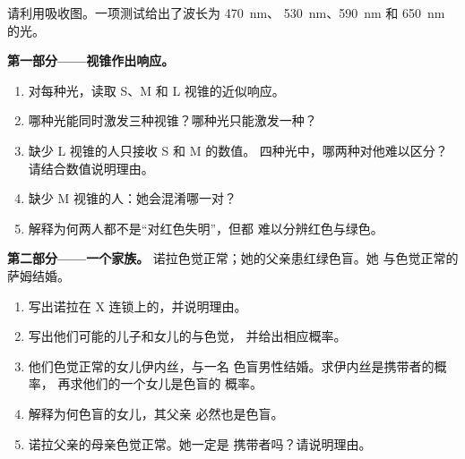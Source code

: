 \begin{problem}
\label{pb:g11:the-eye:1}
请利用吸收图。一项测试给出了波长为 \qty{470}{nm}、
\qty{530}{nm}、\qty{590}{nm} 和 \qty{650}{nm} 的光。

\medskip
\noindent\textbf{第一部分——视锥作出响应。}
\begin{enumerate}
  \item 对每种光，读取 S、M 和
        L 视锥的近似响应。
  \item 哪种光能同时激发三种视锥？哪种光只能激发一种？
  \item 缺少 L 视锥的人只接收 S 和 M 的数值。
        四种光中，哪两种对他难以区分？
        请结合数值说明理由。
  \item 缺少 M 视锥的人：她会混淆哪一对？
  \item 解释为何两人都不是“对红色失明”，但都
        难以分辨红色与绿色。
\end{enumerate}

\medskip
\noindent\textbf{第二部分——一个家族。}
诺拉色觉正常；她的父亲患红绿色盲。她
与色觉正常的萨姆结婚。
\begin{enumerate}[resume]
  \item 写出诺拉在 X 连锁上的，并说明理由。
  \item 写出他们可能的儿子和女儿的与色觉，
        并给出相应概率。
  \item 他们色觉正常的女儿伊内丝，与一名
        色盲男性结婚。求伊内丝是携带者的概率，
        再求他们的一个女儿是色盲的
        概率。
  \item 解释为何色盲的女儿，其父亲
        必然也是色盲。
  \item 诺拉父亲的母亲色觉正常。她一定是
        携带者吗？请说明理由。
\end{enumerate}


\end{problem}
